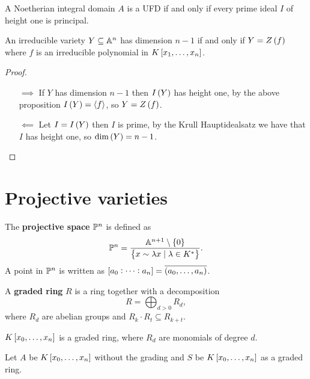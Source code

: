 
\begin{proposition}
A Noetherian integral domain $ A $ is a UFD if and only if every prime ideal $ I $ of height one is principal.
\end{proposition}

\begin{theorem}
An irreducible variety $ Y \subseteq \A^n $ has dimension $ n - 1 $ if and only if $ Y = Z\br{f} $ where $ f $ is an irreducible polynomial in $ K\sbr{x_1, \dots, x_n} $.
\end{theorem}

\begin{proof}
\hfill
\begin{itemize}
\item[$ \implies $] If $ Y $ has dimension $ n - 1 $ then $ I\br{Y} $ has height one, by the above proposition $ I\br{Y} = \abr{f} $, so $ Y = Z\br{f} $.
\item[$ \impliedby $] Let $ I = I\br{Y} $ then $ I $ is prime, by the Krull Hauptidealsatz we have that $ I $ has height one, so $ \dim\br{Y} = n - 1 $.
\end{itemize}
\end{proof}

\pagebreak

\section{Projective varieties}

\begin{definition}
The \textbf{projective space} $ \P^n $ is defined as
$$ \P^n = \dfrac{\A^{n + 1} \setminus \cbr{0}}{\cbr{x \sim \lambda x \mid \lambda \in K^*}}. $$
A point in $ \P^n $ is written as $ \sbr{a_0 : \dots : a_n} = \overline{\br{a_0, \dots, a_n}} $.
\end{definition}

\begin{definition}
A \textbf{graded ring} $ R $ is a ring together with a decomposition
$$ R = \bigoplus_{d > 0} R_d, $$
where $ R_d $ are abelian groups and $ R_k \cdot R_t \subseteq R_{k + t} $.
\end{definition}

\begin{example}
$ K\sbr{x_0, \dots, x_n} $ is a graded ring, where $ R_d $ are monomials of degree $ d $.
\end{example}

\begin{notation}
Let $ A $ be $ K\sbr{x_0, \dots, x_n} $ without the grading and $ S $ be $ K\sbr{x_0, \dots, x_n} $ as a graded ring.
\end{notation}

